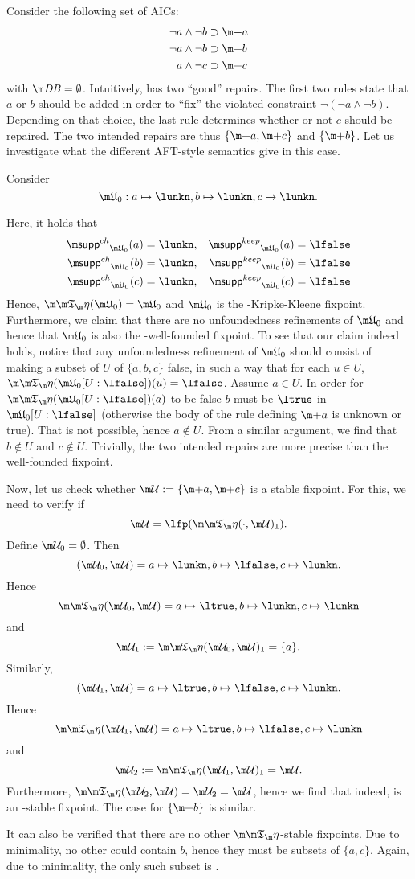 \begin{example}
 Consider the following set \aics of AICs:
\begin{align*}
 \lnot a \land \lnot b&\aicrule \add a \\
 \lnot a \land \lnot b&\aicrule \add b\\
 a \land \lnot c &\aicrule \add c 
 \end{align*} with $\db = \emptyset$.
%  
 Intuitively, \aics has two ``good'' repairs. The first two rules state that $a$ or $b$ should be added in order to ``fix'' the violated constraint $\lnot (\lnot a \land \lnot b)$. 
 Depending on that choice, the last rule determines whether or not $c$ should be repaired.  The two intended repairs are thus $\{\add a,\add c\}$ and $\{\add b\}$. 
 Let us investigate what the different AFT-style semantics give in this case. 
 
 Consider 
\[\UUU_0: a\mapsto \lunkn, b\mapsto \lunkn, c\mapsto\lunkn.\]

Here, it holds that 
\begin{align*}
 \suppin_{\UUU_0}(a) &= \lunkn, & \suppout_{\UUU_0}(a) &=\lfalse \\
 \suppin_{\UUU_0}(b) &= \lunkn, & \suppout_{\UUU_0}(b) &=\lfalse \\
 \suppin_{\UUU_0}(c) &= \lunkn, & \suppout_{\UUU_0}(c) &=\lfalse 
\end{align*}
Hence, $\Ap(\UUU_0) = \UUU_0$ and $\UUU_0$ is the \Ap-Kripke-Kleene fixpoint. 
Furthermore, we claim that there are no unfoundedness refinements of $\UUU_0$ and hence that $\UUU_0$ is also the \Ap-well-founded fixpoint. To see that our claim indeed holds, notice that any unfoundedness refinement of $\UUU_0$ should consist of making a subset of $U$ of $\{a,b,c\}$ false, in such a way that for each $u\in U$, $\Ap(\UUU_0[U: \lfalse])(u)=\lfalse$. 
Assume $a\in U$. In order for $\Ap(\UUU_0[U: \lfalse])(a)$ to be false $b$ must be $\ltrue$ in $\UUU_0[U: \lfalse]$ (otherwise the body of the rule defining $\add a$ is unknown or true). That is not possible, hence $a\not \in U$. From a similar argument, we find that $b\not \in U$ and $c\not \in U$. 
Trivially, the two intended repairs are more precise than the well-founded fixpoint. 

Now, let us check whether $\UU := \{\add a, \add c\}$ is a stable fixpoint. 
For this, we need to verify if 
\[\UU =\lfp(\Ap(\cdot,\UU)_1).\]
Define $\UU_0=\emptyset$. Then 
\[(\UU_0,\UU) = a \mapsto \lunkn, b\mapsto \lfalse, c\mapsto \lunkn.\]
Hence 
\[\Ap(\UU_0,\UU) = a \mapsto \ltrue, b\mapsto \lunkn, c \mapsto \lunkn\]
and 
\[\UU_1 := \Ap(\UU_0,\UU)_1 = \{a\}.\]
Similarly, 
\[(\UU_1,\UU) = a \mapsto \ltrue, b\mapsto \lfalse, c\mapsto \lunkn.\]
Hence 
\[\Ap(\UU_1,\UU) = a \mapsto \ltrue, b\mapsto \lfalse, c \mapsto \lunkn\]
and 
\[\UU_2 := \Ap(\UU_1,\UU)_1 = \UU.\]
Furthermore, $\Ap(\UU_2,\UU) = \UU_2=\UU$, hence  we find that indeed, \UU is an \Ap-stable fixpoint. 
The case for $\{\add b\}$ is similar. 

It can also be verified that there are no other $\Ap$-stable fixpoints. Due to minimality, no other could contain $b$, hence they must be subsets of $\{a,c\}$. Again, due to minimality, the only such subset is \UU.
\end{example}

